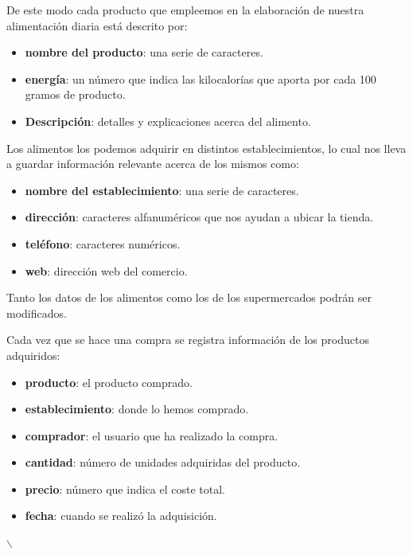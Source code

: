 \documentclass[a4paper,12pt]{report}
\begin{document}
De este modo cada producto que empleemos en la elaboración de
nuestra alimentación diaria está descrito por:
\begin{itemize}
\item \textbf{nombre del producto}: una serie de caracteres.
\item \textbf{energía}: un número que indica las kilocalorías que aporta por
cada 100 gramos de producto.
\item \textbf{Descripción}: detalles y explicaciones acerca del alimento.
\end{itemize}

Los alimentos los podemos adquirir en distintos establecimientos,
lo cual nos lleva a guardar información relevante acerca de los
mismos como:
\begin{itemize}
\item \textbf{nombre del establecimiento}: una serie de caracteres.
\item \textbf{dirección}: caracteres alfanuméricos que nos ayudan a ubicar la tienda.
\item \textbf{teléfono}: caracteres numéricos.
\item \textbf{web}: dirección web del comercio.
\end{itemize}

Tanto los datos de los alimentos como los de los supermercados
podrán ser modificados.


Cada vez que se hace una compra se registra información de los
productos adquiridos:
\begin{itemize}
\item \textbf{producto}: el producto comprado.
\item \textbf{establecimiento}: donde lo hemos comprado.
\item \textbf{comprador}: el usuario que ha realizado la compra.
\item \textbf{cantidad}: número de unidades adquiridas del producto.
\item \textbf{precio}: número que indica el coste total.
\item \textbf{fecha}: cuando se realizó la adquisición.
\end{itemize}

$\backslash$\newpage
\end{document}
